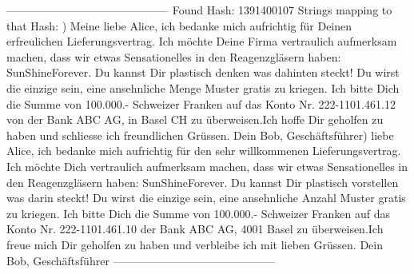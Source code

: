 \documentclass[12pt]{scrartcl}
\begin{document}
--------------------------------------------\newline
Found Hash: 1391400107\newline
Strings mapping to that Hash: ) Meine liebe Alice, ich bedanke mich aufrichtig für Deinen erfreulichen Lieferungsvertrag. Ich möchte Deine Firma vertraulich aufmerksam machen, dass wir etwas Sensationelles in den Reagenzgläsern haben: SunShineForever. Du kannst Dir plastisch denken was dahinten steckt! Du wirst die einzige sein, eine ansehnliche Menge Muster gratis zu kriegen. Ich bitte Dich die Summe von 100.000.- Schweizer Franken auf das Konto Nr. 222-1101.461.12 von der Bank ABC AG, in Basel CH zu überweisen.Ich hoffe Dir geholfen zu haben und schliesse ich freundlichen Grüssen. Dein Bob, Geschäftsführer) liebe Alice, ich bedanke mich aufrichtig für den sehr willkommenen Lieferungsvertrag. Ich möchte Dich vertraulich aufmerksam machen, dass wir etwas Sensationelles in den Reagenzgläsern haben: SunShineForever. Du kannst Dir plastisch vorstellen was darin steckt! Du wirst die einzige sein, eine ansehnliche Anzahl Muster gratis zu kriegen. Ich bitte Dich die Summe von 100.000.- Schweizer Franken auf das Konto Nr. 222-1101.461.10 der  Bank ABC AG, 4001 Basel zu überweisen.Ich freue mich Dir geholfen zu haben und verbleibe ich mit lieben Grüssen. Dein Bob, Geschäftsführer\newline
--------------------------------------------


 
\end{document}
